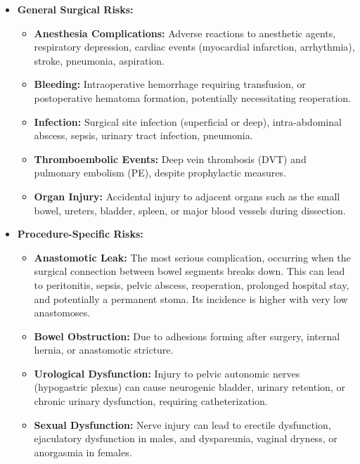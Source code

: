 \begin{itemize}
  \item \textbf{General Surgical Risks:}
    \begin{itemize}
      \item \textbf{Anesthesia Complications:} Adverse reactions to anesthetic agents, respiratory depression, cardiac events (myocardial infarction, arrhythmia), stroke, pneumonia, aspiration.
      
      \item \textbf{Bleeding:} Intraoperative hemorrhage requiring transfusion, or postoperative hematoma formation, potentially necessitating reoperation.
      
      \item \textbf{Infection:} Surgical site infection (superficial or deep), intra-abdominal abscess, sepsis, urinary tract infection, pneumonia.
      
      \item \textbf{Thromboembolic Events:} Deep vein thrombosis (DVT) and pulmonary embolism (PE), despite prophylactic measures.
      
      \item \textbf{Organ Injury:} Accidental injury to adjacent organs such as the small bowel, ureters, bladder, spleen, or major blood vessels during dissection.
    \end{itemize}
  
  \item \textbf{Procedure-Specific Risks:}
    \begin{itemize}
      \item \textbf{Anastomotic Leak:} The most serious complication, occurring when the surgical connection between bowel segments breaks down. This can lead to peritonitis, sepsis, pelvic abscess, reoperation, prolonged hospital stay, and potentially a permanent stoma. Its incidence is higher with very low anastomoses.
      
      \item \textbf{Bowel Obstruction:} Due to adhesions forming after surgery, internal hernia, or anastomotic stricture.
      
      \item \textbf{Urological Dysfunction:} Injury to pelvic autonomic nerves (hypogastric plexus) can cause neurogenic bladder, urinary retention, or chronic urinary dysfunction, requiring catheterization.
      
      \item \textbf{Sexual Dysfunction:} Nerve injury can lead to erectile dysfunction, ejaculatory dysfunction in males, and dyspareunia, vaginal dryness, or anorgasmia in females.
      

\end{itemize}
\end{itemize}
